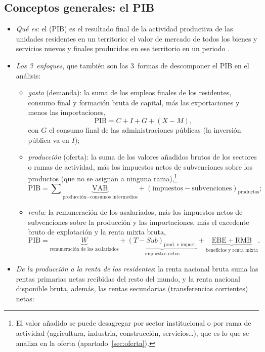 \documentclass[11pt]{article}
\begin{document}
\subsection{Conceptos generales: el PIB}\label{sec:pib}

\begin{itemize}
\item \emph{Qué es}: el  (PIB) es el resultado final de la actividad productiva de las unidades residentes en un territorio: el valor de mercado de todos los bienes y servicios nuevos y finales producidos en ese territorio en un periodo \parencite{SEC2010} .
\item \emph{Los 3~enfoques}, que también son las 3~formas de descomponer el PIB en el análisis:
  \begin{itemize}
  \item \emph{gasto} (demanda): la suma de los empleos finales de los residentes, consumo final y formación bruta de capital, más las exportaciones y menos las importaciones,
\[
\mathrm{PIB}=C+I+G+(X-M),
\]
  con $G$ el consumo final de las administraciones públicas (la inversión pública va en $I$);
  \item \emph{producción} (oferta): la suma de los valores añadidos brutos de los sectores o ramas de actividad, más los impuestos netos de subvenciones sobre los productos (que no se asignan a ninguna rama),\footnote{El valor añadido se puede desagregar por sector institucional o por rama de actividad (agricultura, industria, construcción, servicios…), que es lo que se analiza en la oferta (apartado~\ref{sec:oferta}).}
\[
\mathrm{PIB}=\sum\underbrace{\mathrm{VAB}}_{\text{producción}-\text{consumos intermedios}}+(\text{impuestos}-\text{subvenciones})_{\text{productos}} ;
\]
  \item \emph{renta}: la remuneración de los asalariados, más los impuestos netos de subvenciones sobre la producción y las importaciones, más el excedente bruto de explotación y la renta mixta bruta,
\[
\mathrm{PIB}=\underbrace{W}_{\text{remuneración de los asalariados}}+\underbrace{(T-Sub)_{\text{prod. e import.}}}_{\text{impuestos netos}}+\underbrace{\mathrm{EBE}+\mathrm{RMB}}_{\text{beneficios y renta mixta}} .
\]
  \end{itemize}
\item \emph{De la producción a la renta de los residentes}: la renta nacional bruta suma las rentas primarias netas recibidas del resto del mundo, y la renta nacional disponible bruta, además, las rentas secundarias (transferencias corrientes) netas:

\end{itemize}
\end{document}
